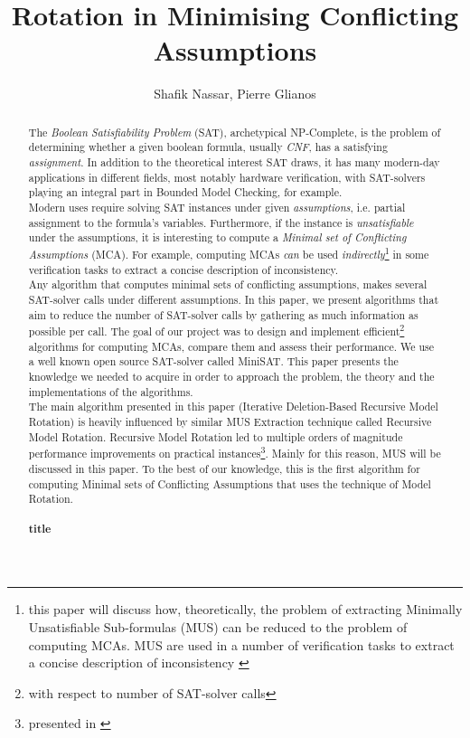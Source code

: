 \documentclass[]{article}
\title{Rotation in Minimising Conflicting Assumptions}
\author{Shafik Nassar, Pierre Glianos}
\begin{document}
	
	\maketitle
	
	\begin{abstract}
		
		The \textit{Boolean Satisfiability Problem} (SAT), archetypical NP-Complete, is the problem of determining whether a given boolean formula, usually \textit{CNF}, has a satisfying \textit{assignment}. In addition to the theoretical interest SAT draws, it has many modern-day applications in different fields, most notably hardware verification, with SAT-solvers playing an integral part in Bounded Model Checking, for example.\\
		Modern uses require solving SAT instances under given \textit{assumptions}, i.e. partial assignment to the formula's variables. Furthermore, if the instance is \textit{unsatisfiable} under the assumptions, it is interesting to compute a \textit{Minimal set of Conflicting Assumptions} (MCA). For example, computing MCAs \textit{can} be used \textit{indirectly}\footnote{this paper will discuss how, theoretically, the problem of extracting Minimally Unsatisfiable Sub-formulas (MUS) can be reduced to the problem of computing MCAs.  MUS are used in a number of verification tasks to extract a concise description of inconsistency \cite{Rotation}} in some verification tasks to extract a concise description of inconsistency.\\
		Any algorithm that computes minimal sets of conflicting assumptions, makes several SAT-solver calls under different assumptions. In this paper, we present algorithms that aim to reduce the number of SAT-solver calls by gathering as much information as possible per call.
		The goal of our project was to design and implement efficient\footnote{with respect to number of SAT-solver calls} algorithms for computing MCAs, compare them and assess their performance. We use a well known open source SAT-solver called MiniSAT. This paper presents the knowledge we needed to acquire in order to approach the problem, the theory and the implementations of the algorithms. \\
		The main algorithm presented in this paper (Iterative Deletion-Based Recursive Model Rotation) is heavily influenced by similar MUS Extraction technique called Recursive Model Rotation. Recursive Model Rotation led to multiple orders of magnitude performance improvements on practical instances\footnote{presented in \cite{Rotation}}. Mainly for this reason, MUS will be discussed in this paper. To the best of our knowledge, this is the first algorithm for computing Minimal sets of Conflicting Assumptions that uses the technique of Model Rotation.
		
		\paragraph{title}
		
	\end{abstract}
	
\end{document}
